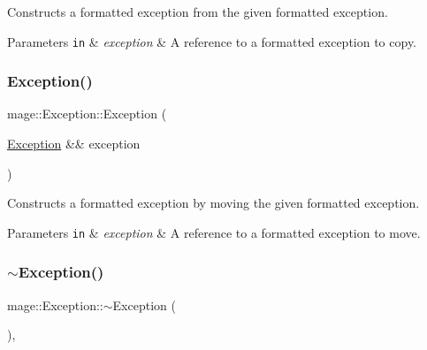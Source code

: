 Constructs a formatted exception from the given formatted exception.


\begin{DoxyParams}[1]{Parameters}
\mbox{\tt in}  & {\em exception} & A reference to a formatted exception to copy. \\
\hline
\end{DoxyParams}
\mbox{\label{classmage_1_1_exception_a5a745eb8921cb986c822c0f95455314a}} 
\subsubsection{\texorpdfstring{Exception()}{Exception()}\hspace{0.1cm}{\footnotesize\ttfamily [5/5]}}
{\footnotesize\ttfamily mage\+::\+Exception\+::\+Exception (\begin{DoxyParamCaption}\item[{\mbox{\hyperlink{classmage_1_1_exception}{Exception}} \&\&}]{exception }\end{DoxyParamCaption})\hspace{0.3cm}{\ttfamily [default]}}

Constructs a formatted exception by moving the given formatted exception.


\begin{DoxyParams}[1]{Parameters}
\mbox{\tt in}  & {\em exception} & A reference to a formatted exception to move. \\
\hline
\end{DoxyParams}
\mbox{\label{classmage_1_1_exception_a088e91ba8dffd31a9d6aa7d4af2ee2c0}} 
\subsubsection{\texorpdfstring{$\sim$\+Exception()}{~Exception()}}
{\footnotesize\ttfamily mage\+::\+Exception\+::$\sim$\+Exception (\begin{DoxyParamCaption}{ }\end{DoxyParamCaption})\hspace{0.3cm}{\ttfamily [virtual]}, {\ttfamily [default]}}

